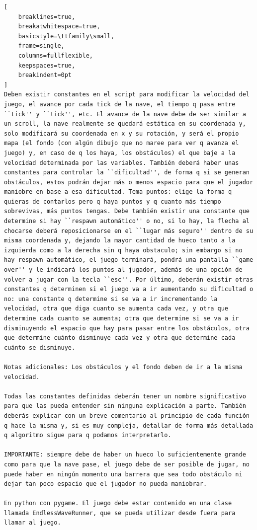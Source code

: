 \begin{lstlisting}[
    breaklines=true,
    breakatwhitespace=true,
    basicstyle=\ttfamily\small,
    frame=single,
    columns=fullflexible,
    keepspaces=true,
    breakindent=0pt
]
Deben existir constantes en el script para modificar la velocidad del juego, el avance por cada tick de la nave, el tiempo q pasa entre ``tick'' y ``tick'', etc. El avance de la nave debe de ser similar a un scroll, la nave realmente se quedará estática en su coordenada y, solo modificará su coordenada en x y su rotación, y será el propio mapa (el fondo (con algún dibujo que no maree para ver q avanza el juego) y, en caso de q los haya, los obstáculos) el que baje a la velocidad determinada por las variables. También deberá haber unas constantes para controlar la ``dificultad'', de forma q si se generan obstáculos, estos podrán dejar más o menos espacio para que el jugador maniobre en base a esa dificultad. Tema puntos: elige la forma q quieras de contarlos pero q haya puntos y q cuanto más tiempo sobrevivas, más puntos tengas. Debe también existir una constante que determine si hay ``respawn automático'' o no, si lo hay, la flecha al chocarse deberá reposicionarse en el ``lugar más seguro'' dentro de su misma coordenada y, dejando la mayor cantidad de hueco tanto a la izquierda como a la derecha sin q haya obstaculo; sin embargo si no hay respawn automático, el juego terminará, pondrá una pantalla ``game over'' y le indicará los puntos al jugador, además de una opción de volver a jugar con la tecla ``esc''. Por último, deberán existir otras constantes q determinen si el juego va a ir aumentando su dificultad o no: una constante q determine si se va a ir incrementando la velocidad, otra que diga cuanto se aumenta cada vez, y otra que determine cada cuanto se aumenta; otra que determine si se va a ir disminuyendo el espacio que hay para pasar entre los obstáculos, otra que determine cuánto disminuye cada vez y otra que determine cada cuánto se disminuye. 

Notas adicionales: Los obstáculos y el fondo deben de ir a la misma velocidad.

Todas las constantes definidas deberán tener un nombre significativo para que las pueda entender sin ninguna explicación a parte. También deberás explicar con un breve comentario al principio de cada función q hace la misma y, si es muy compleja, detallar de forma más detallada q algoritmo sigue para q podamos interpretarlo.

IMPORTANTE: siempre debe de haber un hueco lo suficientemente grande como para que la nave pase, el juego debe de ser posible de jugar, no puede haber en ningún momento una barrera que sea todo obstáculo ni dejar tan poco espacio que el jugador no pueda maniobrar.

En python con pygame. El juego debe estar contenido en una clase llamada EndlessWaveRunner, que se pueda utilizar desde fuera para llamar al juego.
\end{lstlisting}

